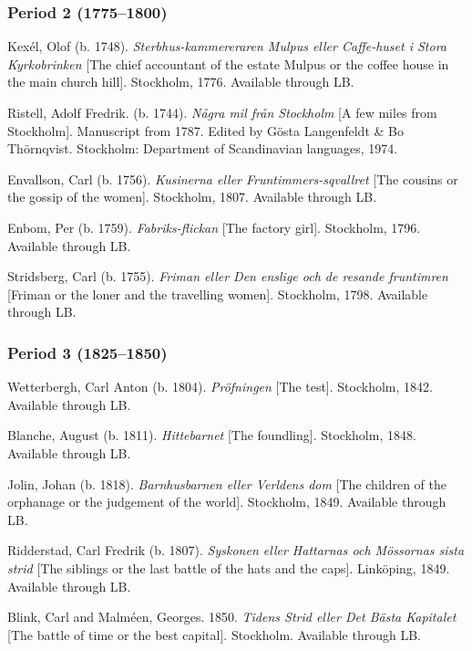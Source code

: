 \documentclass[output=paper, colorlinks, citecolor=brown]{langscibook}
\begin{document}
\subsubsection*{Period 2 (1775–1800)}
\begin{description}[font=\normalfont]\sloppy
\item[2A:] Kexél, Olof (b. 1748). \textit{Sterbhus-kammereraren Mulpus eller Caffe-huset i Stora Kyrkobrinken} [The chief accountant of the estate Mulpus or the coffee house in the main church hill]. Stockholm, 1776. Available through LB.
\item[2B:] Ristell, Adolf Fredrik. (b. 1744). \textit{Några mil från Stockholm} [A few miles from Stockholm]. Manuscript from 1787. Edited by Gösta Langenfeldt \& Bo Thörnqvist. Stockholm: Department of Scandinavian languages, 1974. 
\item[2C:] Envallson, Carl (b. 1756). \textit{Kusinerna eller Fruntimmers-sqvallret} [The cousins or the gossip of the women]. Stockholm, 1807. Available through LB.
\item[2D:] Enbom, Per (b. 1759). \textit{Fabriks-flickan} [The factory girl]. Stockholm, 1796. Available through LB.
\item[2E:] Stridsberg, Carl (b. 1755). \textit{Friman eller Den enslige och de resande fruntimren} [Friman or the loner and the travelling women]. Stockholm, 1798. Available through LB.
\end{description}


\subsubsection*{Period 3 (1825–1850)}
\begin{description}[font=\normalfont]\sloppy
\item[3A:] Wetterbergh, Carl Anton (b. 1804). \textit{Pröfningen} [The test]. Stockholm, 1842. Available through LB.
\item[3B:] Blanche, August (b. 1811). \textit{Hittebarnet} [The foundling]. Stockholm, 1848. Available through LB.
\item[3C:] Jolin, Johan (b. 1818). \textit{Barnhusbarnen eller Verldens dom} [The children of the orphanage or the judgement of the world]. Stockholm, 1849. Available through LB.
\item[3D:] Ridderstad, Carl Fredrik (b. 1807). \textit{Syskonen eller Hattarnas och Mössornas sista strid} [The siblings or the last battle of the hats and the caps]. Linköping, 1849. Available through LB.
\item[3E:] Blink, Carl and Malméen, Georges. 1850. \textit{Tidens Strid eller Det Bästa Kapitalet} [The battle of time or the best capital]. Stockholm. Available through LB.
\end{description}
 
\end{document}
